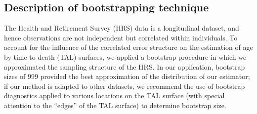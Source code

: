 \documentclass[12pt,oneside,a4paper]{article} %
\begin{document}
\begin{appendices}
% 


\section{Description of bootstrapping technique}
The Health and Retirement Survey (HRS) data is a longitudinal dataset, and hence
observations are not independent but correlated within individuals. To account
for the influence of the correlated error structure on the estimation of age
by time-to-death (TAL) surfaces, we applied a bootstrap
\citep{efron1994introduction} procedure in which we approximated the sampling structure of the HRS. In our
application, bootstrap sizes of 999 provided the best approximation of the distribution of our estimator; if our method is adapted to other datasets, we recommend the use of bootstrap diagnostics applied to various locations on the TAL surface (with special attention to the ``edges'' of the TAL surface) to determine bootstrap size.


\end{appendices}
\end{document}
